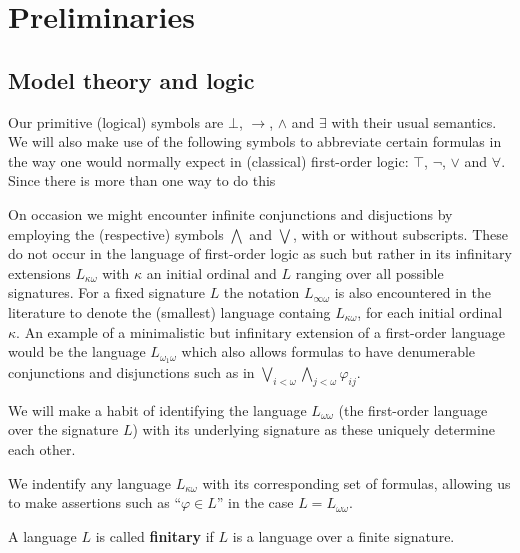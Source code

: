 \chapter{Preliminaries}


\section{Model theory and logic}

Our primitive (logical) symbols are $\bot$, $\rightarrow$, $\wedge$ and $\exists$ with their usual semantics.  We will also make use of the following symbols to abbreviate certain formulas in the way one would normally expect in (classical) first-order logic: $\top$, $\neg$, $\vee$ and $\forall$.  Since there is more than one way to do this

On occasion we might encounter infinite conjunctions and disjuctions by employing the (respective) symbols $\bigwedge$ and $\bigvee$, with or without subscripts.  These do not occur in the language of first-order logic as such but rather in its infinitary extensions $L_{\kappa\omega}$ with $\kappa$ an initial ordinal and $L$ ranging over all possible signatures.  For a fixed signature $L$ the notation $L_{\infty\omega}$ is also encountered in the literature to denote the (smallest) language containg $L_{\kappa\omega}$, for each initial ordinal $\kappa$.  An example of a minimalistic but infinitary extension of a first-order language would be the language $L_{\omega_1\omega}$ which also allows formulas to have denumerable conjunctions and disjunctions such as in $\bigvee_{i<\omega}\bigwedge_{j<\omega}\varphi_{ij}$.

\begin{conv}
	We will make a habit of identifying the language $L_{\omega\omega}$ (the first-order language over the signature $L$) with its underlying signature as these uniquely determine each other.
\end{conv}

\begin{conv}
	We indentify any language $L_{\kappa\omega}$ with its corresponding set of formulas, allowing us to make assertions such as ``$\varphi\in L$'' in the case $L=L_{\omega\omega}$.
\end{conv}

\begin{dfn}
	A language $L$ is called \textbf{finitary} if $L$ is a language over a finite signature.
\end{dfn}

